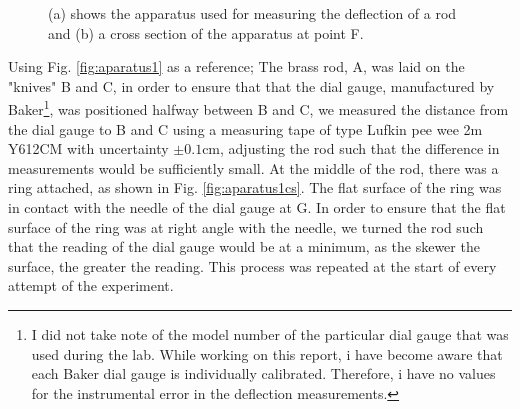 \documentclass[11pt,a4paper]{article}
\begin{document}
    \begin{figure}[H]
      \centering
      \center
      \caption{(a) shows the apparatus used for measuring the deflection of a rod and (b) a cross section of the  apparatus at point F.}
      \label{fig:exp_1}
     \end{figure}

    Using Fig. \ref{fig:aparatus1} as a reference; The brass rod, A, was laid on the "knives" B and C, in order to ensure that that the dial gauge, manufactured by Baker\footnote{I did not take note of the model number of the particular dial gauge that was used during the lab. While working on this report, i have become aware that each Baker dial gauge is individually calibrated. Therefore, i have no values for the instrumental error in the deflection measurements.}, was positioned halfway between B and C, we measured the distance from the dial gauge to B and C using a measuring tape of type Lufkin pee wee 2m Y612CM with uncertainty $\pm 0.1$cm, adjusting the rod such that the difference in measurements would be sufficiently small. At the middle of the rod, there was a ring attached, as shown in Fig. \ref{fig:aparatus1cs}. The flat surface of the ring was in contact with the needle of the dial gauge at G. In order to ensure that the flat surface of the ring was at right angle with the needle, we turned the rod such that the reading of the dial gauge would be at a minimum, as the skewer the surface, the greater the reading. This process was repeated at the start of every attempt of the experiment.
\end{document}
